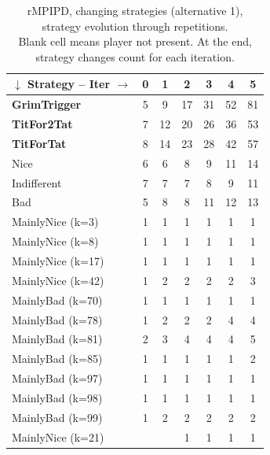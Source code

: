 \documentclass[journal,10pt,twoside]{IEEEtran}
\begin{document}
\begin{table}[ht]
    \caption{rMPIPD, changing strategies (alternative 1), strategy evolution through repetitions.\\
    Blank cell means player not present. At the end, strategy changes count for each iteration.}
    \label{tab:cripdmp}
    \centering
    \begin{tabular}{l|cccccc} \toprule
        $\downarrow$ Strategy -- Iter $\rightarrow$ & 0 & 1 & 2 & 3 & 4 & 5 \\ \midrule
        \textbf{GrimTrigger} &   5 &   9 &   17 &   31 &   52 &   81 \\
        \textbf{TitFor2Tat}  &   7 &  12 &   20 &   26 &   36 &   53 \\
        \textbf{TitForTat}   &   8 &  14 &   23 &   28 &   42 &   57 \\
        Nice                 &   6 &   6 &    8 &    9 &   11 &   14 \\
        Indifferent          &   7 &   7 &    7 &    8 &    9 &   11 \\
        Bad                  &   5 &   8 &    8 &   11 &   12 &   13 \\
        MainlyNice (k=3)     &   1 &   1 &    1 &    1 &    1 &    1 \\
        MainlyNice (k=8)     &   1 &   1 &    1 &    1 &    1 &    1 \\
        MainlyNice (k=17)    &   1 &   1 &    1 &    1 &    1 &    1 \\
        MainlyNice (k=42)    &   1 &   2 &    2 &    2 &    2 &    3 \\
        MainlyBad (k=70)     &   1 &   1 &    1 &    1 &    1 &    1 \\
        MainlyBad (k=78)     &   1 &   2 &    2 &    2 &    4 &    4 \\
        MainlyBad (k=81)     &   2 &   3 &    4 &    4 &    4 &    5 \\
        MainlyBad (k=85)     &   1 &   1 &    1 &    1 &    1 &    2 \\
        MainlyBad (k=97)     &   1 &   1 &    1 &    1 &    1 &    1 \\
        MainlyBad (k=98)     &   1 &   1 &    1 &    1 &    1 &    1 \\
        MainlyBad (k=99)     &   1 &   2 &    2 &    2 &    2 &    2 \\%
        MainlyNice (k=21)    &     &     &    1 &    1 &    1 &    1 \\

\end{tabular}
\end{table}
\end{document}
